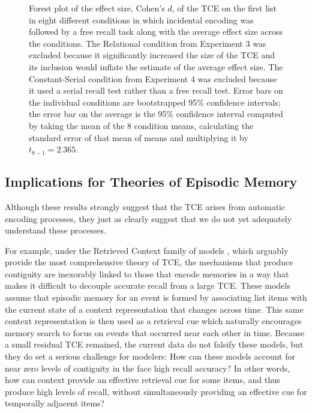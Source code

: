 \documentclass[man,natbib,floatsintext]{apa6} %
\begin{document}
\begin{figure}
\caption{Forest plot of the effect size, Cohen's $d$, of the TCE on the first list in eight different conditions in which incidental encoding was followed by a free recall task along with the average effect size across the conditions. The Relational condition from Experiment 3 was excluded because it significantly increased the size of the TCE and its inclusion would inflate the estimate of the average effect size. The Constant-Serial condition from Experiment 4 was excluded because it used a serial recall test rather than a free recall test. Error bars on the individual conditions are bootstrapped 95\% confidence intervals; the error bar on the average is the 95\% confidence interval computed by taking the mean of the 8 condition means, calculating the standard error of that mean of means and multiplying it by $t_{8-1}=2.365$.}
\label{meta}
\end{figure}

\subsection{Implications for Theories of Episodic Memory}
Although these results strongly suggest that the TCE arises from automatic encoding processes, they just as clearly suggest that we do not yet adequately understand these processes.

For example, under the Retrieved Context family of models \citep[e.g.,][]{PolyEtal09,LohnEtal14,HealKaha15}, which arguably provide the most comprehensive theory of TCE, the mechanisms that produce contiguity are inexorably linked to those that encode memories in a way that makes it difficult to decouple accurate recall from a large TCE. These models assume that episodic memory for an event is formed by associating list items with the current state of a context representation that changes across time. This same context representation is then used as a retrieval cue which naturally encourages memory search to focus on events that occurred near each other in time. Because a small residual TCE remained, the current data do not falsify these models, but they do set a serious challenge for modelers: How can these models account for near zero levels of contiguity in the face high recall accuracy? In other words, how can context provide an effective retrieval cue for some items, and thus produce high levels of recall, without simultaneously providing an effective cue for temporally adjacent items?
\end{document}
